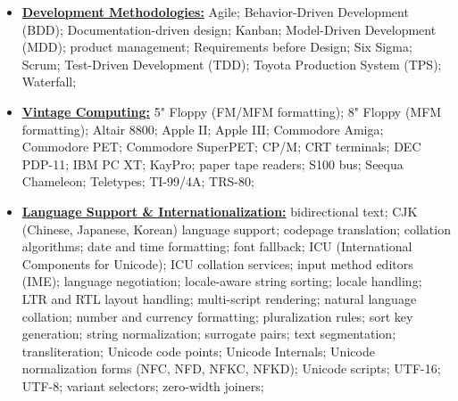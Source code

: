 \documentclass[letterpaper,11pt]{article}
\begin{document}
\begin{multicols}{4}
{\begin{itemize}[leftmargin=0.1in, label={}, itemsep=0pt, parsep=0pt, topsep=0pt, partopsep=0pt]
\item
\textbf{\uline{Development Methodologies:}} \hspace{0pt}
Agile;
Behavior-Driven Development (BDD);
Documentation-driven design;
Kanban;
Model-Driven Development (MDD);
product management;
Requirements before Design;
Six Sigma;
Scrum;
Test-Driven Development (TDD);
Toyota Production System (TPS);
Waterfall;

\item
\textbf{\uline{Vintage Computing:}} \hspace{0pt}
5" Floppy (FM/MFM formatting);
8" Floppy (MFM formatting);
Altair 8800;
Apple II;
Apple III;
Commodore Amiga;
Commodore PET;
Commodore SuperPET;
CP/M;
CRT terminals;
DEC PDP-11;
IBM PC XT;
KayPro;
paper tape readers;
S100 bus;
Seequa Chameleon;
Teletypes;
TI-99/4A;
TRS-80;

\item
\textbf{\uline{Language Support \& Internationalization:}} \hspace{0pt}
bidirectional text;
CJK (Chinese, Japanese, Korean) language support;
codepage translation;
collation algorithms;
date and time formatting;
font fallback;
ICU (International Components for Unicode);
ICU collation services;
input method editors (IME);
language negotiation;
locale-aware string sorting;
locale handling;
LTR and RTL layout handling;
multi-script rendering;
natural language collation;
number and currency formatting;
pluralization rules;
sort key generation;
string normalization;
surrogate pairs;
text segmentation;
transliteration;
Unicode code points;
Unicode Internals;
Unicode normalization forms (NFC, NFD, NFKC, NFKD);
Unicode scripts;
UTF-16;
UTF-8;
variant selectors;
zero-width joiners;


\end{itemize}}
\end{multicols}
\end{document}
